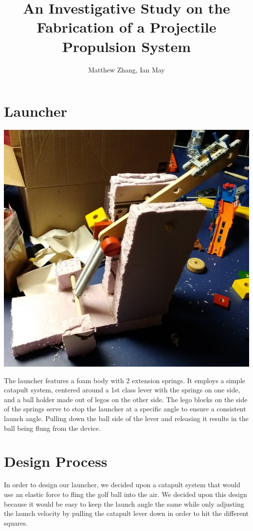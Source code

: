 \documentclass{article}
\title{An Investigative Study on the Fabrication of a Projectile Propulsion System}
\author{Matthew Zhang, Ian May}
\begin{document}
\maketitle

\newpage

\section{Launcher}
{\centering
\includegraphics[width=.8\linewidth]{launcher.png}\par}

The launcher features a foam body with 2 extension springs. It employs a simple catapult system, centered around a 1st class lever with the springs on one side, and a ball holder made out of legos on the other side. The lego blocks on the side of the springs serve to stop the launcher at a specific angle to ensure a consistent launch angle. Pulling down the ball side of the lever and releasing it results in the ball being flung from the device.
\newpage

\section{Design Process}
In order to design our launcher, we decided upon a catapult system that would use an 
elastic force to fling the golf ball into the air. We decided upon this design because 
it would be easy to keep the launch angle the same while only adjusting the launch velocity 
by pulling the catapult lever down in order to hit the different squares.
\end{document}
